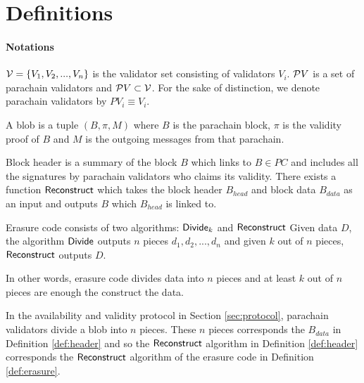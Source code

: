 \section{Definitions}

\paragraph{Notations} $\mathcal{V}= \{V_1,V_2,...,V_n\}$ is the validator set consisting of validators $V_i$. $\mathcal{P}V$ is a set of parachain validators and $\mathcal{P}V \subset \mathcal{V}$. For the sake of distinction, we denote parachain validators by $PV_i \equiv V_i$.

\begin{definition}[Blob]
A blob is a tuple $(B, \pi, M)$ where $B$ is the parachain block, $\pi$ is the validity proof of $B$ and $M$ is the outgoing messages from that parachain.
\end{definition}


\begin{definition}\label{def:header}
Block header is a summary of the block $B$ which links to $B\in PC$ and includes all the signatures by parachain validators who claims its validity. There exists a function $\mathsf{Reconstruct}$ which takes the block header $B_{head}$ and block data $B_{data}$ as an input and outputs $B$ which $B_{head}$ is linked to. 
\end{definition}



\begin{definition}\label{def:erasure}
Erasure code consists of two algorithms: $\mathsf{Divide}_k$ and $\mathsf{Reconstruct}$ Given data $D$, the algorithm $\mathsf{Divide}$ outputs $n$ pieces $d_1,d_2,...,d_n$ and given $k$ out of $n$ pieces, $\mathsf{Reconstruct}$ outputs $D$.  

\end{definition}

In other words, erasure code divides  data into $n$ pieces and at least $k$ out of $n$ pieces are enough the construct the data.

In the availability and validity protocol in Section \ref{sec:protocol}, parachain validators divide a blob into $n$ pieces. These $n$ pieces corresponds the $B_{data}$ in Definition \ref{def:header} and so the $\mathsf{Reconstruct}$ algorithm in Definition \ref{def:header}  corresponds the $\mathsf{Reconstruct}$ algorithm of the erasure code in Definition \ref{def:erasure}.








